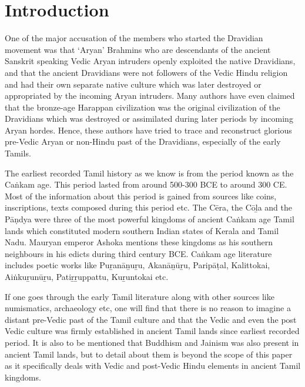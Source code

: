 \section*{Introduction}

One of the major accusation of the members who started the Dravidian movement was that ‘Aryan’ Brahmins who are descendants of the ancient Sanskrit speaking Vedic Aryan intruders openly exploited the native Dravidians, and that the ancient Dravidians were not followers of the Vedic Hindu religion and had their own separate native culture which was later destroyed or appropriated by the incoming Aryan intruders. Many authors have even claimed that the bronze-age Harappan civilization was the original civilization of the Dravidians which was destroyed or assimilated during later periods by incoming Aryan hordes. Hence, these authors have tried to trace and reconstruct glorious pre-Vedic Aryan or non-Hindu past of the Dravidians, especially of the early Tamils.

The earliest recorded Tamil history as we know is from the period known as the Caṅkam age. This period lasted from around 500-300 BCE to around 300 CE. Most of the information about this period is gained from sources like coins, inscriptions, texts composed during this period etc. The Cēra, the Cōḻa and the Pāṇdya were three of the most powerful kingdoms of ancient Caṅkam age Tamil lands which constituted modern southern Indian states of Kerala and Tamil Nadu. Mauryan emperor Ashoka mentions these kingdoms as his southern neighbours in his edicts during third century BCE. Caṅkam age literature includes poetic works like Puṟanāṉuṟu, Akanāṉūṟu, Paripāṭal, Kalittokai, Aiṅkuṟunūṟu, Patiṟṟuppattu, Kuṟuntokai etc.

If one goes through the early Tamil literature along with other sources like numismatics, archaeology etc, one will find that there is no reason to imagine a distant pre-Vedic past of the Tamil culture and that the Vedic and even the post Vedic culture was firmly established in ancient Tamil lands since earliest recorded period. It is also to be mentioned that Buddhism and Jainism was also present in ancient Tamil lands, but to detail about them is beyond the scope of this paper as it specifically deals with Vedic and post-Vedic Hindu elements in ancient Tamil kingdoms.


